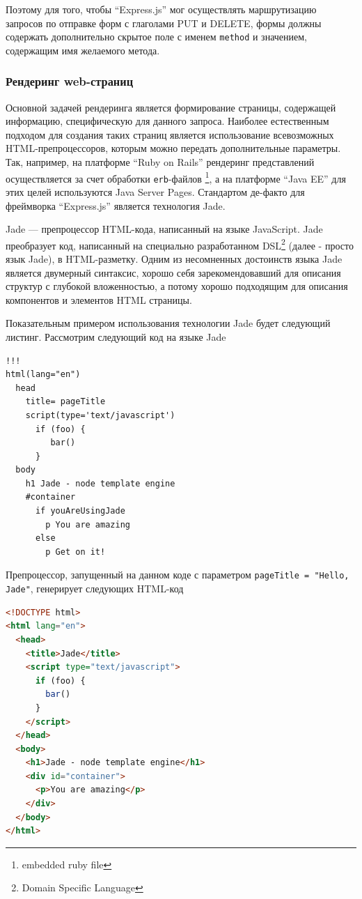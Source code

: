 \documentclass[12pt, a4paper]{article}
\begin{document}
Поэтому для того, чтобы ``Express.js'' мог осуществлять маршрутизацию запросов по
отправке форм с глаголами PUT и DELETE, формы должны содержать дополнительно
скрытое поле с именем \texttt{method} и значением, содержащим имя желаемого
метода.

\subsubsection{Рендеринг web-страниц}

Основной задачей рендеринга является формирование страницы, содержащей
информацию, специфическую для данного запроса. Наиболее естественным подходом
для создания таких страниц является использование всевозможных
HTML-препроцессоров, которым можно передать дополнительные параметры.
Так, например, на платформе ``Ruby on Rails'' рендеринг представлений
осуществляется
за счет обработки \texttt{erb}-файлов \footnote{embedded ruby file}, а на
платформе ``Java EE'' для этих целей используются Java Server Pages. Стандартом
де-факто для фреймворка ``Express.js'' является технология Jade.

Jade --- препроцессор HTML-кода, написанный на языке JavaScript. Jade
преобразует код, написанный на специально разработанном DSL\footnote{Domain
Specific Language} (далее - просто язык Jade), в HTML-разметку. Одним из
несомненных достоинств языка Jade является двумерный синтаксис, хорошо себя
зарекомендовавший для описания структур с глубокой вложенностью, а потому
хорошо подходящим для описания компонентов и элементов HTML страницы.

Показательным примером использования технологии Jade будет следующий листинг.
Рассмотрим следующий код на языке Jade

\begin{lstlisting}
!!!
html(lang="en")
  head
    title= pageTitle
    script(type='text/javascript')
      if (foo) {
         bar()
      }
  body
    h1 Jade - node template engine
    #container
      if youAreUsingJade
        p You are amazing
      else
        p Get on it!
\end{lstlisting}

Препроцессор, запущенный на данном коде с параметром \texttt{pageTitle = "Hello,
Jade"}, генерирует следующих HTML-код

\begin{lstlisting}[language=html]
<!DOCTYPE html>
<html lang="en">
  <head>
    <title>Jade</title>
    <script type="text/javascript">
      if (foo) {
        bar()
      }
    </script>
  </head>
  <body>
    <h1>Jade - node template engine</h1>
    <div id="container">
      <p>You are amazing</p>
    </div>
  </body>
</html>
\end{lstlisting}
\end{document}
